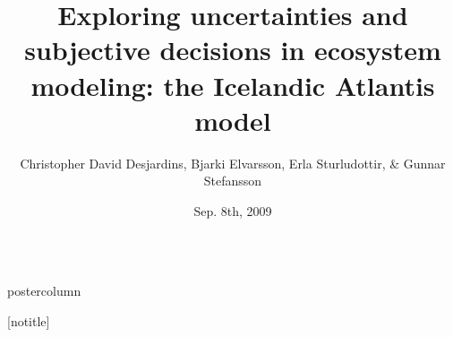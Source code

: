 \documentclass[final,hyperref={pdfpagelabels=false}]{beamer}
\title{\huge Exploring uncertainties and subjective decisions in ecosystem modeling: the Icelandic Atlantis model}
\author{Christopher David Desjardins, Bjarki Elvarsson, Erla Sturludottir, \& Gunnar Stefansson}
\institute[RWTH Aachen University]{Science Institute - University of Iceland, Reykjavik, Iceland}
\date[Sep. 8th, 2009]{Sep. 8th, 2009}
\newlength{\columnheight}
\begin{document}
\begin{frame}
\vspace{.8cm}
  \begin{columns}
    \begin{column}{1\textwidth}
      \begin{beamercolorbox}[center,wd=\textwidth]{postercolumn}
        \begin{minipage}[T]{.98\textwidth}  %
          \parbox[t][\columnheight]{\textwidth}{ %
            [notitle]        
            \begin{block}{}
            \begin{columns}
            \begin{column}{.49\textwidth}
              

\end{column}
\end{columns}
\end{block}}
\end{minipage}
\end{beamercolorbox}
\end{column}
\end{columns}
\end{frame}
\end{document}
